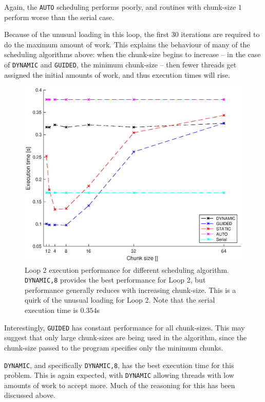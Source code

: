 \documentclass{article} %
\newcommand{\tp}{\texttt}
\begin{document}
Again, the \tp{AUTO} scheduling performs poorly, and routines with chunk-size $1$ perform worse than the serial case.

Because of the unusual loading in this loop, the first 30 iterations are required to do the maximum amount of work.
This explains the behaviour of many of the scheduling algorithms above: when the chunk-size begins to increase -- in the case of \tp{DYNAMIC} and \tp{GUIDED}, the minimum chunk-size -- then fewer threads get assigned the initial amounts of work, and thus execution times will rise.

\begin{figure}
    \centering
    \includegraphics[height=.35\textheight]{part1_plots/all_part2.eps}
    \caption{Loop 2 execution performance for different scheduling algorithm. \tp{DYNAMIC,8} provides the best performance for Loop 2, but performance generally reduces with increasing chunk-size.
    This is a quirk of the unusual loading for Loop 2. Note that the serial execution time is $0.354$s}
    \label{fig:loop2results}
\end{figure}

Interestingly, \tp{GUIDED} has constant performance for all chunk-sizes.
This may suggest that only large chunk-sizes are being used in the algorithm, since the chunk-size passed to the program specifies only the minimum chunks. 

\tp{DYNAMIC}, and specifically \tp{DYNAMIC,8}, has the best execution time for this problem. This is again expected, with \tp{DYNAMIC} allowing threads with low amounts of work to accept more. Much of the reasoning for this has been discussed above.
\end{document}
